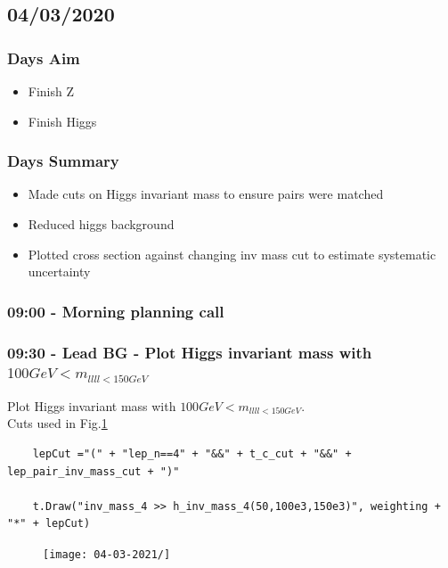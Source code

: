 \subsection*{04/03/2020}

\subsubsection{Days Aim}
\begin{itemize}
    \item Finish Z 
    \item Finish Higgs
\end{itemize}

\subsubsection{Days Summary}
\begin{itemize}
    \item Made cuts on Higgs invariant mass to ensure pairs were matched
    \item Reduced higgs background
    \item Plotted cross section against changing inv mass cut to estimate systematic uncertainty 
\end{itemize}


\subsubsection*{09:00 - Morning planning call}
\subsubsection*{09:30 - Lead BG - Plot Higgs invariant mass with $100 GeV < m_{llll < 150 GeV}$}
Plot Higgs invariant mass with $100 GeV < m_{llll < 150 GeV}$.
\\
Cuts used in Fig.\ref{}
\begin{lstlisting}
    lepCut ="(" + "lep_n==4" + "&&" + t_c_cut + "&&" + lep_pair_inv_mass_cut + ")"
    
    t.Draw("inv_mass_4 >> h_inv_mass_4(50,100e3,150e3)", weighting + "*" + lepCut)
\end{lstlisting}
\begin{figure}[h!]
    \centering
	\texttt{[image: 04-03-2021/]}
    \caption{}
    \label{}
\end{figure}

